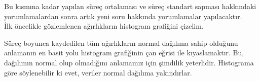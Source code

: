 Bu kısmına kadar yapılan süreç ortalaması ve süreç standart sapması hakkındaki yorumlamalardan sonra artık yeni soru hakkında yorumlamalar yapılacaktır.\\

İlk öncelikle gözlemlenen ağırlıkların histogram grafiğini çizelim. 

\begin{center}
\end{center}

Süreç boyunca kaydedilen tüm ağırlıkların normal dağılıma sahip olduğunu anlamanın en basit yolu histogram grafiğinin çan eğrisi ile kıyaslamaktır. Bu, dağılımın normal olup olmadığını anlamamız için şimdilik yeterlidir. Histograma göre söylenebilir ki evet, veriler normal dağılıma yakındırlar.

